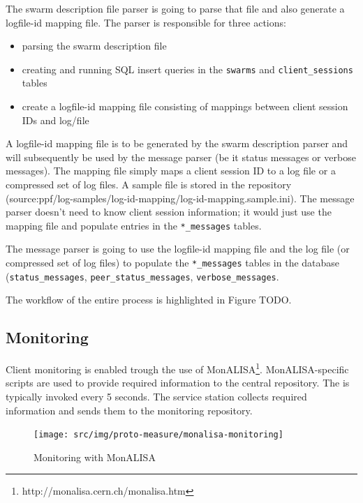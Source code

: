 The swarm description file parser is going to parse that file and also generate a logfile-id mapping file. The parser is responsible for three actions:
\begin{itemize}
  \item parsing the swarm description file
  \item creating and running SQL insert queries in the \texttt{swarms} and
  \texttt{client\_sessions} tables
  \item create a logfile-id mapping file consisting of mappings between client
  session IDs and log/file
\end{itemize}

A logfile-id mapping file is to be generated by the swarm description parser
and will subsequently be used by the message parser (be it status messages or
verbose messages). The mapping file simply maps a client session ID to a log
file or a compressed set of log files. A sample file is stored in the
repository (source:ppf/log-samples/log-id-mapping/log-id-mapping.sample.ini).
The message parser doesn't need to know client session information; it would
just use the mapping file and populate entries in the \texttt{*\_messages}
tables.

The message parser is going to use the logfile-id mapping file and the log
file (or compressed set of log files) to populate the \texttt{*\_messages}
tables in the database (\texttt{status\_messages},
\texttt{peer\_status\_messages}, \texttt{verbose\_messages}.

The workflow of the entire process is highlighted in Figure TODO.


\subsection{Monitoring}

Client monitoring is enabled trough the use of
MonALISA\footnote{http://monalisa.cern.ch/monalisa.htm}. MonALISA-specific
scripts are used to provide required information to the central repository.
The is typically invoked every 5 seconds. The service station collects
required information and sends them to the monitoring repository.

\begin{figure}[h]
  \begin{center}
    \texttt{[image: src/img/proto-measure/monalisa-monitoring]}
  \end{center}
  \caption{Monitoring with MonALISA}
  \label{fig:proto-measure:monitoring}
\end{figure}

